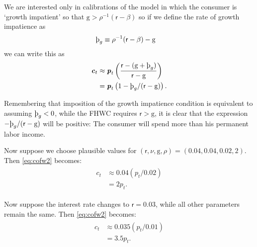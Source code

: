 \documentclass{scrartcl}
\begin{document}
We are interested only in calibrations of the model in which the consumer is `growth impatient' so that $\mathrm{g} > \rho^{-1}(\mathsf{r}-\beta)$ so if we define the rate of growth impatience as 
\begin{equation}\begin{gathered}\begin{aligned} \label{eq:patwGro}
\text{\thorn}_{g} & \equiv  \rho^{-1}(\mathsf{r}-\beta)-\mathrm{g} 
\end{aligned}\end{gathered}\end{equation}
we can write this as 
\begin{equation}\begin{gathered}\begin{aligned}
        \boldsymbol{\mathit{c}}_{t} & \approx  \boldsymbol{\mathit{p}}_{t} \left(\frac{\mathsf{r} - (\mathrm{g}+\text{\thorn}_{g})}{\mathsf{r}-\mathrm{g}}\right)
\\ & =  \boldsymbol{\mathit{p}}_{t} \left(1 - \text{\thorn}_{g}/(\mathsf{r} - \mathrm{g})\right). \label{eq:CvsP}
\end{aligned}\end{gathered}\end{equation}

Remembering that imposition of the growth impatience condition is equivalent to assuming $\text{\thorn}_{g} < 0$, while the FHWC requires $\mathsf{r} > \mathrm{g}$, it is clear that the expression $-\text{\thorn}_{g}/(\mathsf{r}-\mathrm{g})$ will be positive:  The consumer will spend more than his permanent labor income.

Now suppose we choose plausible values for $(\mathsf{r}, \nu, \mathrm{g}, \rho) = (0.04,0.04,0.02,2)$.
Then \eqref{eq:cofw2} becomes:
\begin{equation}\begin{gathered}\begin{aligned}
        \boldsymbol{\mathit{c}}_{t} & \approx  0.04 (\boldsymbol{\mathit{p}}_{t}/0.02) \\
         & =  2 \boldsymbol{\mathit{p}}_{t}.
\end{aligned}\end{gathered}\end{equation}

Now suppose the interest rate changes to $\mathsf{r}=0.03$, while all other parameters
remain the same.
Then \eqref{eq:cofw2} becomes:
\begin{equation}\begin{gathered}\begin{aligned}
        \boldsymbol{\mathit{c}}_{t} & \approx  0.035 (\boldsymbol{\mathit{p}}_{t}/0.01)  \\
         & =  3.5 \boldsymbol{\mathit{p}}_{t}.
\end{aligned}\end{gathered}\end{equation}
\end{document}
